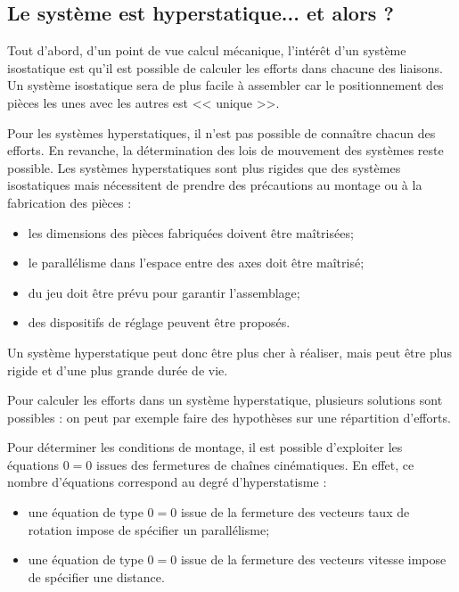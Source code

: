 \subsection{Le système est hyperstatique... et alors ?}

Tout d'abord, d'un point de vue calcul mécanique, l'intérêt d'un système isostatique est qu'il est possible de calculer les efforts dans chacune des liaisons. Un système isostatique sera de plus facile à assembler car le positionnement des pièces les unes avec les autres est << unique >>. 

Pour les systèmes hyperstatiques, il n'est pas possible de connaître chacun des efforts. En revanche, la détermination des lois de mouvement des systèmes reste possible. Les systèmes hyperstatiques sont plus rigides que des systèmes isostatiques mais nécessitent de prendre des précautions au montage ou à la fabrication des pièces : 
\begin{itemize}
 \item les dimensions des pièces fabriquées doivent être maîtrisées;
 \item le parallélisme dans l'espace entre des axes doit être maîtrisé;
 \item du jeu doit être prévu pour garantir l'assemblage;
 \item des dispositifs de réglage peuvent être proposés.
\end{itemize}

Un système hyperstatique peut donc être plus cher à réaliser, mais peut être plus rigide et d'une plus grande durée de vie. 

Pour calculer les efforts dans un système hyperstatique, plusieurs solutions sont possibles : on peut par exemple faire des hypothèses sur une répartition d'efforts. 


\begin{methode}
Pour déterminer les conditions de montage, il est possible d'exploiter les équations $0=0$ issues des fermetures de chaînes cinématiques.  En effet, ce nombre d'équations correspond  au degré d'hyperstatisme :
\begin{itemize}
\item une équation de type $0=0$ issue de la fermeture des vecteurs taux de rotation impose de spécifier un parallélisme;
\item une équation de type $0=0$ issue de la fermeture des vecteurs vitesse impose de spécifier une distance.
\end{itemize}
\end{methode}

